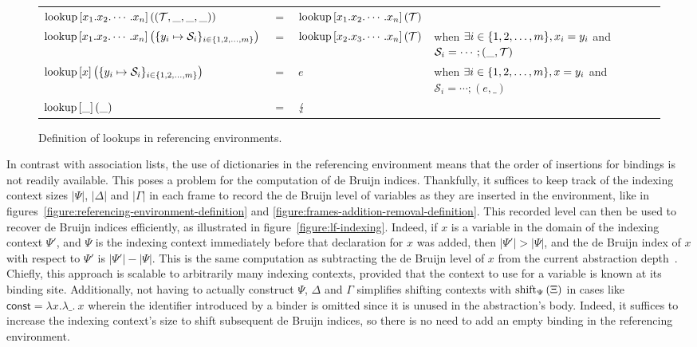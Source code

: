 \begin{figure}[H]
{{\begin{tabular}{lcl>{\raggedright\let\newline\\\arraybackslash\hspace{0pt}}p{5cm}}
$ \operatorname{lookup}\left[x_1.x_2.\cdots.x_n\right]\left((\mathcal{T}, \_, \_, \_)\right) $ & $ = $ & $ \operatorname{lookup}\left[x_1.x_2.\cdots.x_n\right]\left(\mathcal{T}\right) $ &\\
$ \operatorname{lookup}\left[x_1.x_2.\cdots.x_n\right]\left(\{y_i \mapsto \mathcal{S}_i\}_{i \in \{1, 2, \dots, m\}}\right) $ & $ = $ & $ \operatorname{lookup}\left[x_2.x_3.\cdots.x_n\right]\left(\mathcal{T}\right) $ & when $ \exists i \in \{1, 2, \dots, m\}, x_i = y_i $ and $ \mathcal{S}_i = \cdots ; (\_, \mathcal{T}) $\\
$ \operatorname{lookup}\left[x\right]\left(\{y_i \mapsto \mathcal{S}_i\}_{i \in \{1, 2, \dots, m\}}\right) $ & $ = $ & $ e $ & when $ \exists i \in \{1, 2, \dots, m\}, x = y_i $ and $ \mathcal{S}_i = \cdots ; (e, \_) $\\
$ \operatorname{lookup}\left[\_\right]\left(\_\right) $ & $ = $ & $ \lightning $ &
\end{tabular}
}
}
\caption[Definition of lookups in referencing environments]{%
Definition of lookups in referencing environments.
}
\label{figure:lookup-definition}
\end{figure}

In contrast with association lists, the use of dictionaries in the referencing environment means that the order of insertions for bindings is not readily available.
This poses a problem for the computation of de Bruijn indices.
Thankfully, it suffices to keep track of the indexing context sizes $|\Psi|$, $|\Delta|$ and $|\Gamma|$ in each frame to record the de Bruijn level of variables as they are inserted in the environment, like in figures~\ref{figure:referencing-environment-definition} and \ref{figure:frames-addition-removal-definition}.
This recorded level can then be used to recover de Bruijn indices efficiently, as illustrated in figure~\ref{figure:lf-indexing}.
Indeed, if $x$ is a variable in the domain of the indexing context $\Psi'$, and $\Psi$ is the indexing context immediately before that declaration for $x$ was added, then $|\Psi'| > |\Psi|$, and the de Bruijn index of $x$ with respect to $\Psi'$ is $|\Psi'| - |\Psi|$.
This is the same computation as subtracting the de Bruijn level of $x$ from the current abstraction depth~\cite{DEBRUIJN1972381, debruijnlevels1995}.
Chiefly, this approach is scalable to arbitrarily many indexing contexts, provided that the context to use for a variable is known at its binding site.
Additionally, not having to actually construct $\Psi$, $\Delta$ and $\Gamma$ simplifies shifting contexts with $\operatorname{shift}_{\Psi}\left(\Xi\right)$ in cases like $\mathsf{const} = \lambda x.\lambda\_.\ x$ wherein the identifier introduced by a binder is omitted since it is unused in the abstraction's body.
Indeed, it suffices to increase the indexing context's size to shift subsequent de Bruijn indices, so there is no need to add an empty binding in the referencing environment.

